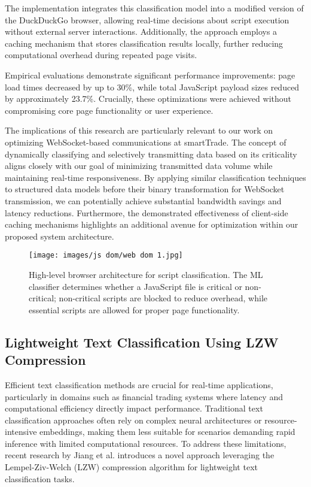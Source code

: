 \documentclass[a4paper, 11pt, twoside, openright]{report}
\begin{document}
The implementation integrates this classification model into a modified version of the DuckDuckGo browser, allowing real-time decisions about script execution without external server interactions. Additionally, the approach employs a caching mechanism that stores classification results locally, further reducing computational overhead during repeated page visits.

Empirical evaluations demonstrate significant performance improvements: page load times decreased by up to 30\%, while total JavaScript payload sizes reduced by approximately 23.7\%. Crucially, these optimizations were achieved without compromising core page functionality or user experience.

The implications of this research are particularly relevant to our work on optimizing WebSocket-based communications at smartTrade. The concept of dynamically classifying and selectively transmitting data based on its criticality aligns closely with our goal of minimizing transmitted data volume while maintaining real-time responsiveness. By applying similar classification techniques to structured data models before their binary transformation for WebSocket transmission, we can potentially achieve substantial bandwidth savings and latency reductions. Furthermore, the demonstrated effectiveness of client-side caching mechanisms highlights an additional avenue for optimization within our proposed system architecture.

\begin{figure}[ht]
    \centering
    \texttt{[image: images/js dom/web dom 1.jpg]}
    \caption{High-level browser architecture for script classification. The ML classifier determines whether a JavaScript file is critical or non-critical; non-critical scripts are blocked to reduce overhead, while essential scripts are allowed for proper page functionality.}
    \label{fig:slimweb_architecture}
\end{figure}


\subsection{Lightweight Text Classification Using LZW Compression}

Efficient text classification methods are crucial for real-time applications, particularly in domains such as financial trading systems where latency and computational efficiency directly impact performance. Traditional text classification approaches often rely on complex neural architectures or resource-intensive embeddings, making them less suitable for scenarios demanding rapid inference with limited computational resources. To address these limitations, recent research by Jiang et al. introduces a novel approach leveraging the Lempel-Ziv-Welch (LZW) compression algorithm for lightweight text classification tasks.
\end{document}
